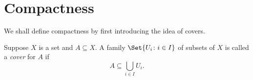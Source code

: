 \documentclass[main.tex]{subfiles}
\begin{document}
	\section{Compactness}
	We shall define compactness by first introducing the idea of covers.
	\begin{definition}
		Suppose $X$ is a set and $A \subseteq X$. A family $\Set{U_i \colon i \in I}$ of subsets of $X$ is called a \textit{cover}  for $A$ if
		\begin{equation*}
			A \subseteq\bigcup_{i \in I} U_i.
		\end{equation*}
	\end{definition}
\end{document}
